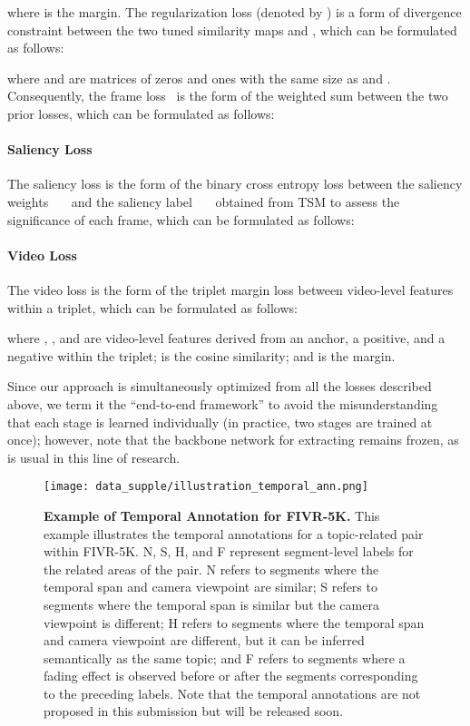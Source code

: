 \documentclass[10pt,twocolumn,letterpaper]{article}
\begin{document}
        where  is the margin. The regularization loss (denoted by ) is a form of divergence constraint between the two tuned similarity maps  and , which can be formulated as follows:
        
        where  and  are matrices of zeros and ones with the same size as  and . Consequently, the frame loss~ is the form of the weighted sum between the two prior losses, which can be formulated as follows:
        

        \paragraph{Saliency Loss \\}
        The saliency loss  is the form of the binary cross entropy loss between the saliency weights~~~ and the saliency label~~~ obtained from TSM to assess the significance of each frame, which can be formulated as follows:
        

        \paragraph{Video Loss \\}
        The video loss  is the form of the triplet margin loss between video-level features within a triplet, which can be formulated as follows:
        
        where , , and  are video-level features derived from an anchor, a positive, and a negative within the triplet;  is the cosine similarity; and  is the margin.

        Since our approach is simultaneously optimized from all the losses described above, we term it the ``end-to-end framework'' to avoid the misunderstanding that each stage is learned individually (in practice, two stages are trained at once); however, note that the backbone network for extracting  remains frozen, as is usual in this line of research.


    
        \begin{figure}[!t]
            \centering
            \texttt{[image: data\_supple/illustration\_temporal\_ann.png]} 
            \caption{\textbf{Example of Temporal Annotation for FIVR-5K.} This example illustrates the temporal annotations for a topic-related pair within FIVR-5K. N, S, H, and F represent segment-level labels for the related areas of the pair. N refers to segments where the temporal span and camera viewpoint are similar; S refers to segments where the temporal span is similar but the camera viewpoint is different; H refers to segments where the temporal span and camera viewpoint are different, but it can be inferred semantically as the same topic; and F refers to segments where a fading effect is observed before or after the segments corresponding to the preceding labels. Note that the temporal annotations are not proposed in this submission but will be released soon.\vspace{-0mm}} \label{fig:temporal_ann}
        \end{figure}
\end{document}
